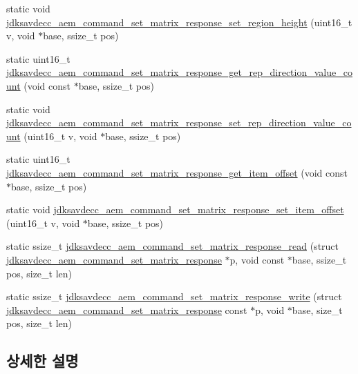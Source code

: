 \begin{DoxyCompactItemize}
\item 
static void \hyperlink{group__command__set__matrix__response_ga798bcf71e29d3e5df2348dfb52202769}{jdksavdecc\+\_\+aem\+\_\+command\+\_\+set\+\_\+matrix\+\_\+response\+\_\+set\+\_\+region\+\_\+height} (uint16\+\_\+t v, void $\ast$base, ssize\+\_\+t pos)
\item 
static uint16\+\_\+t \hyperlink{group__command__set__matrix__response_ga4c517fd6f384a10d7b5cf5642726d6e5}{jdksavdecc\+\_\+aem\+\_\+command\+\_\+set\+\_\+matrix\+\_\+response\+\_\+get\+\_\+rep\+\_\+direction\+\_\+value\+\_\+count} (void const $\ast$base, ssize\+\_\+t pos)
\item 
static void \hyperlink{group__command__set__matrix__response_ga6f8ed8f618be7698e37e92f2796fdac6}{jdksavdecc\+\_\+aem\+\_\+command\+\_\+set\+\_\+matrix\+\_\+response\+\_\+set\+\_\+rep\+\_\+direction\+\_\+value\+\_\+count} (uint16\+\_\+t v, void $\ast$base, ssize\+\_\+t pos)
\item 
static uint16\+\_\+t \hyperlink{group__command__set__matrix__response_ga1617695deb39c26860a110e64d19bb09}{jdksavdecc\+\_\+aem\+\_\+command\+\_\+set\+\_\+matrix\+\_\+response\+\_\+get\+\_\+item\+\_\+offset} (void const $\ast$base, ssize\+\_\+t pos)
\item 
static void \hyperlink{group__command__set__matrix__response_gace6e5551c76a893e681188c5dcd9fbb2}{jdksavdecc\+\_\+aem\+\_\+command\+\_\+set\+\_\+matrix\+\_\+response\+\_\+set\+\_\+item\+\_\+offset} (uint16\+\_\+t v, void $\ast$base, ssize\+\_\+t pos)
\item 
static ssize\+\_\+t \hyperlink{group__command__set__matrix__response_gaf76c329d39a776a3e0e55212ad1db1a9}{jdksavdecc\+\_\+aem\+\_\+command\+\_\+set\+\_\+matrix\+\_\+response\+\_\+read} (struct \hyperlink{structjdksavdecc__aem__command__set__matrix__response}{jdksavdecc\+\_\+aem\+\_\+command\+\_\+set\+\_\+matrix\+\_\+response} $\ast$p, void const $\ast$base, ssize\+\_\+t pos, size\+\_\+t len)
\item 
static ssize\+\_\+t \hyperlink{group__command__set__matrix__response_ga8389d09bf683989b1447cbd0d3f00179}{jdksavdecc\+\_\+aem\+\_\+command\+\_\+set\+\_\+matrix\+\_\+response\+\_\+write} (struct \hyperlink{structjdksavdecc__aem__command__set__matrix__response}{jdksavdecc\+\_\+aem\+\_\+command\+\_\+set\+\_\+matrix\+\_\+response} const $\ast$p, void $\ast$base, size\+\_\+t pos, size\+\_\+t len)
\end{DoxyCompactItemize}


\subsection{상세한 설명}


